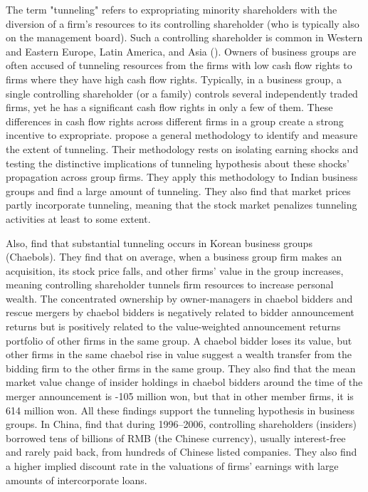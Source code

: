 \documentclass[final,1p,authoryear]{elsarticle}
\begin{document}
The term "tunneling" refers to expropriating minority shareholders with the diversion of a firm's resources to its controlling shareholder (who is typically also on the management board). Such a controlling shareholder is common in Western and Eastern Europe, Latin America, and Asia (\cite{doi:10.1111/0022-1082.00115}). Owners of business groups are often accused of tunneling resources from the firms with low cash flow rights to firms where they have high cash flow rights. Typically, in a business group, a single controlling shareholder (or a family) controls several independently traded firms, yet he has a significant cash flow rights in only a few of them. These differences in cash flow rights across different firms in a group create a strong incentive to expropriate. \cite{RePEc:oup:qjecon:v:117:y:2002:i:1:p:121-148.} propose a general methodology to identify and measure the extent of tunneling. Their methodology rests on isolating earning shocks and testing the distinctive implications of tunneling hypothesis about these shocks' propagation across group firms. They apply this methodology to Indian business groups and find a large amount of tunneling. They also find that market prices partly incorporate tunneling, meaning that the stock market penalizes tunneling activities at least to some extent.
 
Also, \cite{doi:10.1111/1540-6261.00510} find that substantial tunneling occurs in Korean business groups (Chaebols). They find that on average, when a business group firm makes an acquisition, its stock price falls, and other firms' value in the group increases, meaning controlling shareholder tunnels firm resources to increase personal wealth. The concentrated ownership by owner-managers in chaebol bidders and rescue mergers by chaebol bidders is negatively related to bidder announcement returns but is positively related to the value-weighted announcement returns portfolio of other firms in the same group. A chaebol bidder loses its value, but other firms in the same chaebol rise in value suggest a wealth transfer from the bidding firm to the other firms in the same group. They also find that the mean market value change of insider holdings in chaebol bidders around the time of the merger announcement is -105 million won, but that in other member firms, it is 614 million won. All these findings support the tunneling hypothesis in business groups. In China, \cite{JIANG20101} find that during 1996–2006, controlling shareholders (insiders) borrowed tens of billions of RMB (the Chinese currency), usually interest-free and rarely paid back, from hundreds of Chinese listed companies. They also find a higher implied discount rate in the valuations of firms' earnings with large amounts of intercorporate loans.
\end{document}
